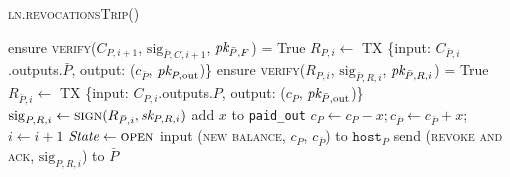 \begin{center}
  \begin{processbox}{\textsc{ln}.\textsc{revocationsTrip}()}
    \ \\
    \begin{algorithmic}[1]
      \State ensure \textsc{verify}($C_{P, i+1}$, $\mathrm{sig}_{\bar{P}, C,
      i+1}$, $\textit{pk}_{\bar{P}, F}$) = True
      \label{code:ln:pay:revocations:verify-comm}
      \State $R_{P, i} \gets$ TX \{input: $C_{\bar{P}, i}$.outputs.$\bar{P}$,
      output: ($c_{\bar{P}}$, $\textit{pk}_{P, \mathrm{out}}$)\}
      \State ensure \textsc{verify}($R_{P, i}$, $\mathrm{sig}_{\bar{P}, R,
      i}$, $\textit{pk}_{\bar{P}, R, i}$) = True
      \label{code:ln:pay:revocations:verify-rev}
      \State $R_{\bar{P}, i} \gets$ TX \{input: $C_{P, i}$.outputs.$P$, output:
      ($c_P$, $\textit{pk}_{\bar{P}, \mathrm{out}}$)\}
      \State $\mathrm{sig}_{P, R, i} \gets \textsc{sign}(R_{\bar{P}, i},
      \textit{sk}_{P, R, i})$
      \label{code:ln:pay:revocations:sign-rev}
      \State add $x$ to \texttt{paid\_out}
      \label{code:ln:pay:revocations:paid-out}
      \State $c_P \gets c_P - x; c_{\bar{P}} \gets c_{\bar{P}} + x$; $i \gets
      i + 1$
      \State $\itistate \gets \textsc{open}$
       
        \State input (\textsc{new balance}, $c_P$, $c_{\bar{P}}$) to
        $\texttt{host}_P$
        \State {}
        \State {}
        \State {}
        \State {}
        \State {}
      \EndIf
      \State send (\textsc{revoke and ack}, $\mathrm{sig}_{P, R, i}$) to
      $\bar{P}$
      \label{code:ln:pay:revocations:send-rev}
      \State {}
      \State {}
      \State {}
      \label{code:ln:pay:revocations:verify}
      \State {}

\end{algorithmic}
\end{processbox}
\end{center}
